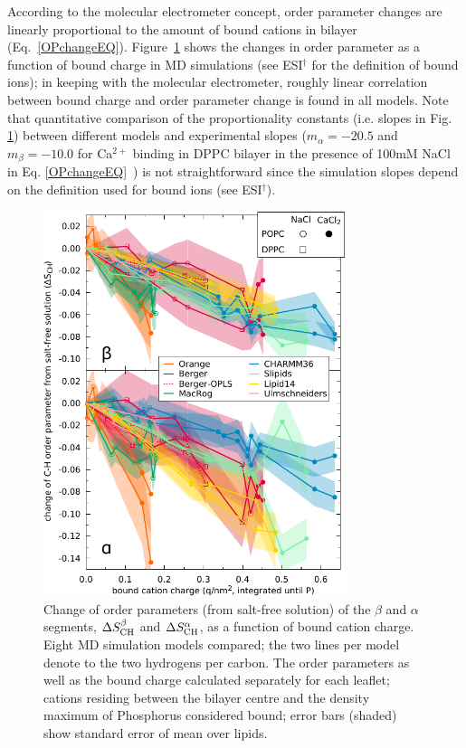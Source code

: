 \documentclass[twoside,twocolumn,9pt]{article}
\begin{document}
According to the molecular electrometer concept, order parameter changes are linearly proportional to
the amount of bound cations in bilayer (Eq.~\eqref{OPchangeEQ}).
Figure~\ref{electrometer} shows the changes in order parameter as a function of bound charge in MD simulations
(see ESI$^\dag$ for the definition of bound ions);
in keeping with the molecular electrometer, roughly linear correlation between bound charge and order parameter change is found in all models.
Note that quantitative comparison of the proportionality constants (i.e. slopes in Fig. \ref{electrometer})
between different models and experimental slopes
($m_\alpha=-20.5$ and $m_\beta=-10.0$ for Ca$^{2+}$ binding in DPPC bilayer in
the presence of 100mM NaCl in Eq. \ref{OPchangeEQ}~\cite{altenbach84}) is not straightforward 
since the simulation slopes depend on the definition used for bound ions (see ESI$^\dag$).
\begin{figure}[t]
  \centering
  \includegraphics[width=8.8cm]{../Fig/dOP_vs_boundCationCharge_P.pdf}
  \caption{\label{electrometer}
    Change of order parameters (from salt-free solution) of the $\beta$ and $\alpha$ segments,
    $\Delta S_{\rm{CH}}^{\beta}$ and $\Delta S_{\rm{CH}}^{\alpha}$,
    as a function of bound cation charge.
    Eight MD simulation models compared; the two lines per model denote to the two hydrogens per carbon.
    The order parameters as well as the bound charge calculated separately for
    each leaflet; cations residing between the bilayer centre and the density maximum of Phosphorus
    considered bound; error bars (shaded) show standard error of mean over lipids.
   }
\end{figure}
\end{document}
